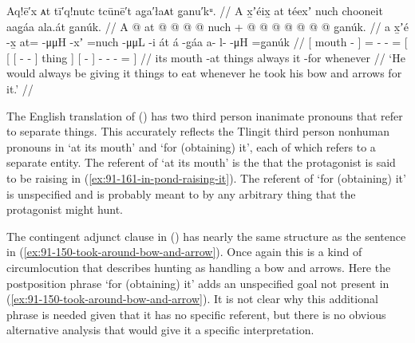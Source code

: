 \ex\label{ex:91-162-always-feed-whenever-take-bow-and-arrows}%
%
\begingl
	\glpreamble	Aq!ē′x ᴀt tī′q!nutc tcūnē′t ag̣a′łaᴀt g̣anu′kᵘ. //
	\glpreamble	A x̱ʼéix̱ at téexʼ nuch chooneit aag̱áa ala.át g̱anúk. //
	\gla	{} A  @ {} {}
		at @  @ {} @ {} @ \•nuch +
		{} {} {}  @ {} @ {} {} {} {}
			{}  @ {} {}
			 @ {} @ {} @ {} @ \•g̱anúk. {} //
	\glb	{} a x̱ʼé -x̱ {}
		at=  -μμH -xʼ =nuch
		{} {} {}  -μμL -i {} át {}
			{} á -g̱áa {}
			a- l-  -μH =g̱anúk {} //
	\glc	{}[  mouth - {}]
		=  - -\hspace{1ex} =
		{}[ {}[ {}[  - - {}] thing {}]
			{}[  - {}]
			- -  - = {}] //
	\gld	{} its mouth -at {}
		things\•  {} {} \•always
		{} {} {}  {} {} {} {} {}
			{} it -for {}
			 {} {} {} \•whenever {} //
	\glft	‘He would always be giving it things to eat whenever he took his bow and arrows for it.’
		//
\endgl
\xe

The English translation of (\lastx) has two third person inanimate  pronouns that refer to separate things.
This accurately reflects the Tlingit third person nonhuman pronouns in  ‘at its mouth’ and  ‘for (obtaining) it’, each of which refers to a separate entity.
The referent of  ‘at its mouth’ is the  that the protagonist is said to be raising in (\ref{ex:91-161-in-pond-raising-it}).
The referent of  ‘for (obtaining) it’ is unspecified and is probably meant to by any arbitrary thing that the protagonist might hunt.

The contingent adjunct clause in (\lastx) has nearly the same structure as the sentence in (\ref{ex:91-150-took-around-bow-and-arrow}).
Once again this is a kind of circumlocution that describes hunting as handling a bow and arrows. Here the postposition phrase  ‘for (obtaining) it’ adds an unspecified goal not present in (\ref{ex:91-150-took-around-bow-and-arrow}).
It is not clear why this additional phrase is needed given that it has no specific referent, but there is no obvious alternative analysis that would give it a specific interpretation.

